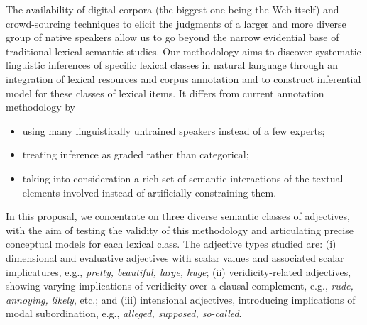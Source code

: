\documentclass[10pt]{article}
\newcommand{\moveup}{\vspace*{-1.8mm}}
\begin{document}
The availability of digital corpora (the biggest one being the Web itself) and crowd-sourcing techniques to elicit the judgments of a larger and more diverse group of native speakers allow us to go beyond the narrow evidential base of traditional lexical semantic studies. Our methodology aims to discover systematic linguistic inferences of specific lexical classes in natural language through an integration of lexical resources and corpus annotation and to construct  inferential model for these classes of lexical items. It differs from current annotation methodology by
\begin{itemize}
\moveup
\item using many linguistically untrained speakers instead of a few experts;
\moveup
\item treating inference as graded rather than categorical;
\moveup
\item taking into consideration a rich set of semantic interactions of the textual elements involved instead of artificially constraining them.
\moveup
\end{itemize}


 
In this proposal, we concentrate on three diverse semantic classes of adjectives, with the aim of testing the validity of this methodology and articulating precise conceptual models for each lexical class. The adjective types studied are: (i) dimensional and evaluative adjectives with scalar values and associated scalar implicatures, e.g., \textit{pretty, beautiful, large, huge}; (ii) veridicity-related adjectives, showing varying implications of veridicity over a clausal complement, e.g., \textit{rude, annoying, likely}, etc.; and (iii) intensional adjectives, introducing implications of modal subordination, e.g., \textit{alleged, supposed, so-called}. 
\end{document}
